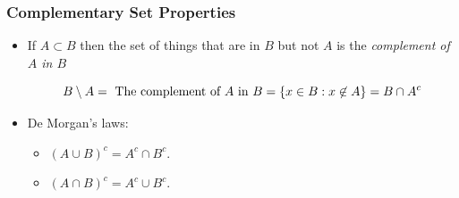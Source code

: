 \documentclass[aspectratio=169, handout]{beamer}
\numberwithin{equation}{section}
\begin{document}












\begin{frame}
\frametitle{Complementary Set Properties}

\begin{itemize}
\item If $A\subset B$ then the set of things that are in $B$ but not $A$ is the \textit{complement of $A$ in $B$} \pause

$$B\setminus A= \hbox{ The complement of $A$ in $B$} = \{x\in B: x\not\in A\}= B\cap A^c$$ \pause

\item De Morgan's laws:
\begin{itemize}
\item $(A\cup B)^c=A^c\cap B^c$.
\item $(A\cap B)^c=A^c\cup B^c$.
\end{itemize}\pause

\end{itemize}
\end{frame}
\end{document}
